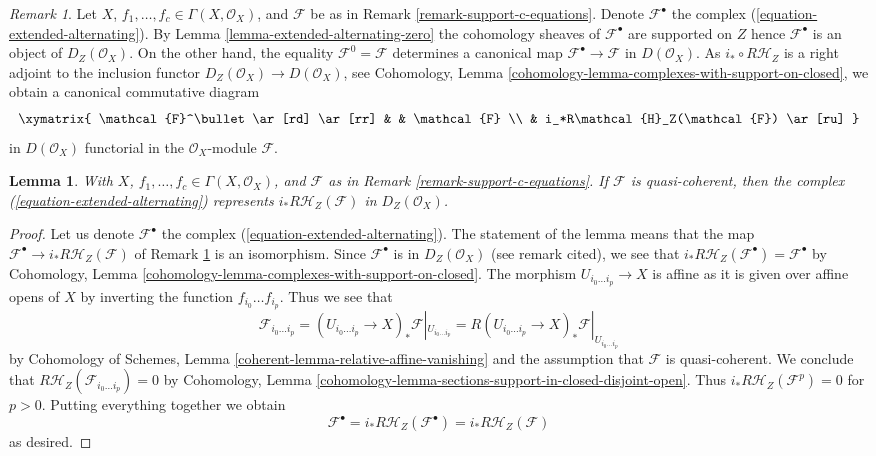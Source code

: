 \documentclass{stacks-project}
\theoremstyle{plain}
\newtheorem{lemma}[subsection]{Lemma}
\theoremstyle{definition}
\theoremstyle{remark}
\newtheorem{remark}[subsection]{Remark}
\numberwithin{equation}{subsection}
\begin{document}
\begin{remark}
\label{remark-extended-alternating-map-to-support}
Let $X$, $f_1, \ldots, f_c \in \Gamma(X, \mathcal{O}_X)$, and
$\mathcal{F}$ be as in Remark \ref{remark-support-c-equations}.
Denote $\mathcal{F}^\bullet$ the complex
(\ref{equation-extended-alternating}). By
Lemma \ref{lemma-extended-alternating-zero}
the cohomology sheaves of $\mathcal{F}^\bullet$
are supported on $Z$ hence $\mathcal{F}^\bullet$ is an object of
$D_Z(\mathcal{O}_X)$. On the other hand, the equality
$\mathcal{F}^0 = \mathcal{F}$ determines a canonical map
$\mathcal{F}^\bullet \to \mathcal{F}$ in $D(\mathcal{O}_X)$.
As $i_* \circ R\mathcal{H}_Z$ is a right adjoint to the
inclusion functor $D_Z(\mathcal{O}_X) \to D(\mathcal{O}_X)$, see
Cohomology, Lemma \ref{cohomology-lemma-complexes-with-support-on-closed},
we obtain a canonical commutative diagram
$$
\xymatrix{
\mathcal{F}^\bullet \ar[rd] \ar[rr] & & \mathcal{F} \\
& i_*R\mathcal{H}_Z(\mathcal{F}) \ar[ru]
}
$$
in $D(\mathcal{O}_X)$ functorial in the $\mathcal{O}_X$-module $\mathcal{F}$.
\end{remark}

\begin{lemma}
\label{lemma-extended-alternating-represented}
With $X$, $f_1, \ldots, f_c \in \Gamma(X, \mathcal{O}_X)$, and
$\mathcal{F}$ as in Remark \ref{remark-support-c-equations}.
If $\mathcal{F}$ is quasi-coherent, then the complex
(\ref{equation-extended-alternating}) represents
$i_* R\mathcal{H}_Z(\mathcal{F})$ in $D_Z(\mathcal{O}_X)$.
\end{lemma}

\begin{proof}
Let us denote $\mathcal{F}^\bullet$ the complex
(\ref{equation-extended-alternating}).
The statement of the lemma means that the map
$\mathcal{F}^\bullet \to i_*R\mathcal{H}_Z(\mathcal{F})$
of Remark \ref{remark-extended-alternating-map-to-support}
is an isomorphism. Since $\mathcal{F}^\bullet$ is in
$D_Z(\mathcal{O}_X)$ (see remark cited), we see that
$i_*R\mathcal{H}_Z(\mathcal{F}^\bullet) = \mathcal{F}^\bullet$
by Cohomology, Lemma \ref{cohomology-lemma-complexes-with-support-on-closed}.
The morphism $U_{i_0 \ldots i_p} \to X$ is affine
as it is given over affine opens of $X$ by inverting the function
$f_{i_0} \ldots f_{i_p}$. Thus we see that
$$
\mathcal{F}_{i_0 \ldots i_p} =
(U_{i_0 \ldots i_p} \to X)_*\mathcal{F}|_{U_{i_0 \ldots i_p}} =
R(U_{i_0 \ldots i_p} \to X)_*\mathcal{F}|_{U_{i_0 \ldots i_p}}
$$
by Cohomology of Schemes, Lemma \ref{coherent-lemma-relative-affine-vanishing}
and the assumption that $\mathcal{F}$ is quasi-coherent. We conclude that
$R\mathcal{H}_Z(\mathcal{F}_{i_0 \ldots i_p}) = 0$ by Cohomology, Lemma
\ref{cohomology-lemma-sections-support-in-closed-disjoint-open}.
Thus $i_*R\mathcal{H}_Z(\mathcal{F}^p) = 0$ for $p > 0$.
Putting everything together we obtain
$$
\mathcal{F}^\bullet = i_*R\mathcal{H}_Z(\mathcal{F}^\bullet) =
i_*R\mathcal{H}_Z(\mathcal{F})
$$
as desired.
\end{proof}
\end{document}
